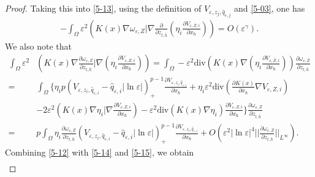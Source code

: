\documentclass[12pt,reqno]{amsart}
\numberwithin{equation}{section}
\theoremstyle{definition}
\theoremstyle{remark}
\begin{document}
\begin{proof}
Taking this into \eqref{5-13}, using the definition of $ V_{\varepsilon, z_j, \hat{q}_{\varepsilon,j}} $ and \eqref{5-03}, one has
\begin{equation}\label{5-14}
\begin{split}
-\int_{\Omega} \varepsilon^2 \left (K(x) \nabla\omega_{\varepsilon,Z}| \nabla \frac{\partial  }{\partial z_{l,\bar{h}}}\left( \eta_i\frac{\partial V_{\varepsilon, Z,i}}{\partial x_\hbar}\right)\right )=O\left( \varepsilon^\gamma\right).
\end{split}
\end{equation}
We also note that
\begin{equation}\label{5-15}
\begin{split}
\int_{\Omega}\varepsilon^2& \left (K(x) \nabla \frac{\partial \omega_{\varepsilon,Z} }{\partial z_{l,\bar{h}}}| \nabla \left( \eta_i\frac{\partial V_{\varepsilon, Z,i}}{\partial x_\hbar}\right)\right )=\int_{\Omega}-\varepsilon^2  \text{div}\left (K(x) \nabla \left( \eta_i\frac{\partial V_{\varepsilon, Z,i}}{\partial x_\hbar}\right)\right )\frac{\partial \omega_{\varepsilon,Z} }{\partial z_{l,\bar{h}}}\\
=&\int_{\Omega}\bigg\{\eta_ip\left (V_{\varepsilon, z_i, \hat{q}_{\varepsilon,i}}-\hat{q}_{\varepsilon,i}|\ln\varepsilon|\right )^{p-1}_+\frac{\partial V_{\varepsilon, z_i, \hat{q}_{\varepsilon,i}}}{\partial x_\hbar}+\eta_i\varepsilon^2\text{div}\left (\frac{\partial K(x)}{\partial x_\hbar}\nabla V_{\varepsilon, Z,i}  \right ) \\
& -2 \varepsilon^2\left (K(x)\nabla\eta_i|\nabla   \frac{\partial V_{\varepsilon, Z,i}}{\partial x_\hbar}  \right ) -\varepsilon^2\text{div}\left (K(x)\nabla   \eta_i  \right )\frac{\partial V_{\varepsilon, Z,i}}{\partial x_\hbar} \bigg\}\frac{\partial \omega_{\varepsilon,Z} }{\partial z_{l,\bar{h}}}\\
=& p\int_{\Omega}\eta_i\frac{\partial \omega_{\varepsilon,Z} }{\partial z_{l,\bar{h}}} \left (V_{\varepsilon, z_i, \hat{q}_{\varepsilon,i}}-\hat{q}_{\varepsilon,i}|\ln\varepsilon|\right )^{p-1}_+\frac{\partial V_{\varepsilon, z_i, \hat{q}_{\varepsilon,i}}}{\partial x_\hbar}+O\left( \varepsilon^2|\ln\varepsilon|^{4}\bigg|\bigg|\frac{\partial \omega_{\varepsilon,Z} }{\partial z_{l,\bar{h}}}\bigg|\bigg|_{L^\infty}\right).
\end{split}
\end{equation}
Combining \eqref{5-12} with \eqref{5-14} and \eqref{5-15}, we obtain
\begin{equation}\label{5-16}
\begin{split}

\end{split}
\end{equation}
\end{proof}
\end{document}
